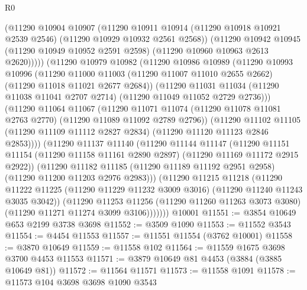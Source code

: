 \begin{lexlean}{R0}
\begin{coremodule}
            (@11290
              @10904
              @10907
              (@11290
                @10911
                @10914
                (@11290 @10918 @10921 @2539 @2546)
                (@11290 @10929 @10932 @2561 @2568))
              (@11290
                @10942
                @10945
                (@11290 @10949 @10952 @2591 @2598)
                (@11290 @10960 @10963 @2613 @2620)))))
        (@11290
          @10979
          @10982
          (@11290
            @10986
            @10989
            (@11290
              @10993
              @10996
              (@11290
                @11000
                @11003
                (@11290 @11007 @11010 @2655 @2662)
                (@11290 @11018 @11021 @2677 @2684))
              (@11290
                @11031
                @11034
                (@11290 @11038 @11041 @2707 @2714)
                (@11290 @11049 @11052 @2729 @2736)))
            (@11290
              @11064
              @11067
              (@11290
                @11071
                @11074
                (@11290 @11078 @11081 @2763 @2770)
                (@11290 @11089 @11092 @2789 @2796))
              (@11290
                @11102
                @11105
                (@11290 @11109 @11112 @2827 @2834)
                (@11290 @11120 @11123 @2846 @2853))))
          (@11290
            @11137
            @11140
            (@11290
              @11144
              @11147
              (@11290
                @11151
                @11154
                (@11290 @11158 @11161 @2890 @2897)
                (@11290 @11169 @11172 @2915 @2922))
              (@11290
                @11182
                @11185
                (@11290 @11189 @11192 @2951 @2958)
                (@11290 @11200 @11203 @2976 @2983)))
            (@11290
              @11215
              @11218
              (@11290
                @11222
                @11225
                (@11290 @11229 @11232 @3009 @3016)
                (@11290 @11240 @11243 @3035 @3042))
              (@11290
                @11253
                @11256
                (@11290 @11260 @11263 @3073 @3080)
                (@11290 @11271 @11274 @3099 @3106)))))))
    @10001
@11551 := @3854 @10649 @653 @2199 @3738 @3698
@11552 := @3509 @1090
@11553 := @11552 @3543
@11554 := @4454 @11553
@11557 := @11551 @11554 (@3762 @10001)
@11558 := @3870 @10649
@11559 := @11558 @102
@11564 := @11559 @1675 @3698 @3700 @4453 @11553
@11571 := @3879 @10649 @81 @4453 (@3884 (@3885 @10649 @81))
@11572 := @11564 @11571
@11573 := @11558 @1091
@11578 := @11573 @104 @3698 @3698 @1090 @3543

\end{coremodule}
\end{lexlean}
